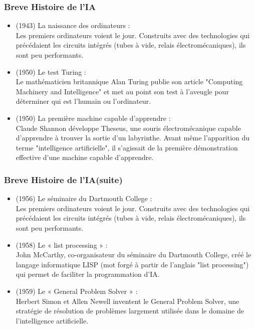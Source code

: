 \documentclass{beamer}
\begin{document}
	\begin{frame}[fragile]
	\frametitle{Breve Histoire de l'IA}
	\begin{itemize}
		\itemsep0.5em
		\item (1943) La naissance des ordinateurs :\\
		 Les premiers ordinateurs voient le jour. Construits avec des technologies qui précédaient les circuits intégrés (tubes à vide, relais électromécaniques), ils sont peu performants.
		 
		 \item (1950) Le test Turing : \\
		 Le mathématicien britannique Alan Turing publie son article "Computing Machinery and Intelligence" et met au point son test à l’aveugle pour déterminer qui est l’humain ou l’ordinateur.

		 \item (1950) La première machine capable d’apprendre :\\
		 Claude Shannon développe Theseus, une souris électromécanique capable d’apprendre à trouver la sortie d’un labyrinthe. Avant même l’apparition du terme "intelligence artificielle", il s’agissait de la première démonstration effective d’une machine capable d’apprendre.

	\end{itemize}
	\end{frame}
	
	\begin{frame}[fragile]
	\frametitle{Breve Histoire de l'IA(suite)}
	\begin{itemize}
		\itemsep1em
		\item (1956) Le séminaire du Dartmouth College :\\
		 Les premiers ordinateurs voient le jour. Construits avec des technologies qui précédaient les circuits intégrés (tubes à vide, relais électromécaniques), ils sont peu performants.
		 
		 \item (1958) Le « list processing » : \\
		 John McCarthy, co-organisateur du séminaire du Dartmouth College, créé le langage informatique LISP (mot forgé à partir de l’anglais "list processing") qui permet de faciliter la programmation d’IA.

		 \item (1959) Le « General Problem Solver » :\\
		 Herbert Simon et Allen Newell inventent le General Problem Solver, une stratégie de résolution de problèmes largement utilisée dans le domaine de l'intelligence artificielle.

	\end{itemize}
	\end{frame}
	
\end{document}

